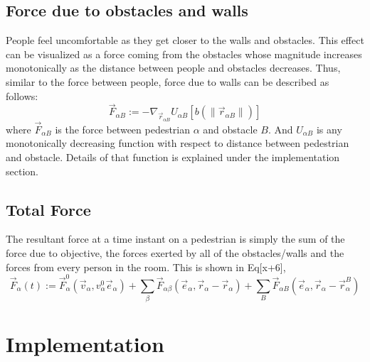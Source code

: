 \documentclass[11pt]{article}
\begin{document}
\subsection{Force due to obstacles and walls}
People feel uncomfortable as they get closer to the walls and obstacles. This effect can be visualized as a force coming from the obstacles whose magnitude increases monotonically as the distance between people and obstacles decreases. Thus, similar to the force between people, force due to walls can be described as follows:
\begin{equation}
    \vec{F}_{\alpha B}:=-\nabla_{\vec{r}_{\alpha B}}U_{\alpha B}[b(\|\vec{r}_{\alpha B}\|)]
\end{equation}
where $ \vec{F}_{\alpha B}$ is the force between pedestrian $\alpha$ and obstacle $B$. And $U_{\alpha B}$ is any monotonically decreasing function with respect to distance between pedestrian and obstacle. Details of that function is explained under the implementation section.

\subsection{Total Force}
The resultant force at a time instant on a pedestrian is simply the sum of the force due to objective, the forces exerted by all of the obstacles/walls and the forces from every person in the room. This is shown in Eq[x+6],
\begin{equation}
    \vec{F}_\alpha(t):=\vec{F}_\alpha^0(\vec{v}_\alpha,v_\alpha^0\vec{e}_\alpha)+\sum_\beta\vec{F}_{\alpha\beta}(\vec{e}_\alpha,\vec{r}_\alpha-\vec{r}_\alpha)+\sum_B\vec{F}_{\alpha B}(\vec{e}_\alpha,\vec{r}_\alpha-\vec{r}_\alpha^B)
\end{equation}

\section{Implementation}
\end{document}
